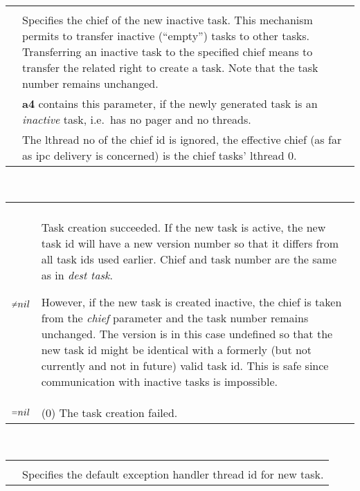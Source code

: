 \documentclass[a4paper,11pt,twoside,dvips]{book}
\makeatletter
\newcommand{\smaller}[1]{{\mathchoice 
           {\raisebox{1pt}{$\scriptstyle #1$}} 
           {\raisebox{1pt}{$\scriptstyle #1$}} 
           {\raisebox{0.5pt}{$\scriptscriptstyle #1$}} 
           {\raisebox{0.5pt}{$\scriptscriptstyle #1$}} 
}}
\newcommand{\EQ}{\smaller{=}}
\newcommand{\NE}{\smaller{\neq}}
\newlength{\Up}\setlength{\Up}{-\baselineskip}
\newlength{\Params}
\newenvironment{param}[1] 
{%
\setlength{\Params}{\textwidth}\addtolength{\Params}{-140pt}%
\par\vspace{5pt}%
\noindent\begin{minipage}{\textwidth} 
\noindent {\em #1}\\[\Up]%
\noindent\begin{tabular}{@{\hspace*{75pt}}lp{\Params}}%
\hspace*{30pt}&\\[\Up]%
} 
{%
\end{tabular}\end{minipage}\par\vspace{5pt}%
}
\newcommand{\reg}[1]{\mbox{\textbf{#1}}}
\makeatother
\begin{document}
 
\begin{param}{new chief}&  Specifies the chief of the new inactive task.
                           This mechanism permits to transfer inactive
                           (``empty'') tasks to other tasks. Transferring an
                           inactive task to the specified chief means to
                           transfer the related right to create a task. Note
                           that the task number remains unchanged.\\ 
                     &     \reg{a4} contains this parameter, if the newly
                           generated task is an {\em inactive} task, i.e.\
                           has no pager and no threads. \\
		     &     The lthread no of the chief id is ignored,
                           the effective chief (as far as ipc delivery
                           is concerned) is the chief tasks' lthread 0.
\end{param} 
 
 
 
\begin{param}{new task id} 
            $\NE nil$ & Task creation succeeded. If the new task is
                           active, the new task id will have a new
                           version number so that it differs from all
                           task ids used earlier. Chief and task number
                           are the same as in {\em dest task}.

			   \cbstart However, if the new task is created
                           inactive, the chief is taken from the {\em
                           chief} parameter and the task number remains
                           unchanged. The version is in this case
                           undefined \cbend so that the new task id
                           might be identical with a formerly (but not
                           currently and not in future) valid task
                           id. This is safe since communication with
                           inactive tasks is impossible.\\[5pt]
% 
            $\EQ nil$ &    (0) The task creation failed. 
\end{param} 
 

\begin{param}{excpt id} 
              & Specifies the default exception handler thread id for
              new task.
\end{param}
 
\end{document}
